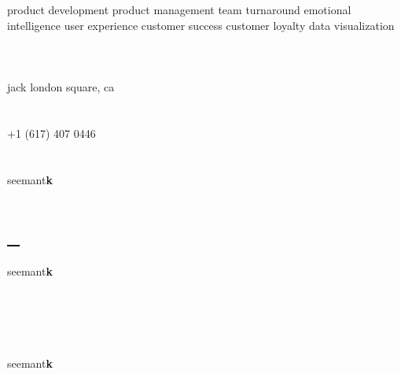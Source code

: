 \documentclass[]{friggeri-cv} %
\newcommand{\rotxc}[1]{\begin{sideways}#1\end{sideways}}
\newcommand{\invert}[1]{\rotxc{\rotxc{#1}}}
\begin{document}
\begin{aside} %
\section{{\scriptsize \reflectbox{\invert{\faicon{key}}}}}
product development
product management
team turnaround
emotional intelligence
user experience
customer success
customer loyalty
data visualization
~
~
\section{{\scriptsize {}}}
jack london square, ca
~
~
\section{\href{tel:617.407.0446}{\scriptsize {}}}
+1 (617) 407 0446
~
~
\section{\href{skype:seemantk}{{\scriptsize {}}}}
seemant\textbf{k}
~
~
\section{\href{mailto:seemantk@gmail.com}{\scriptsize {}~}}
seemant\textbf{k}
~
~
\section{\href{http://www.github.com/seemantk}{{\scriptsize {}}} ~ \href{http://www.twitter.com/seemantk}{{\scriptsize {}}} ~ \href{http://www.linkedin.com/in/seemantk}{{\scriptsize {}}}}
seemant\textbf{k}
\end{aside}
\end{document}

